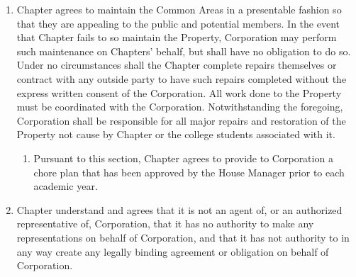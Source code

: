 \documentclass[12pt]{article}
\begin{document}
\begin{enumerate}
        \item Chapter agrees to maintain the Common Areas in a presentable fashion so that they are appealing to the public and potential members.
                In the event that Chapter fails to so maintain the Property, Corporation may perform such maintenance on Chapters' behalf, but shall have no obligation to do so.
                Under no circumstances shall the Chapter complete repairs themselves or contract with any outside party to have such repairs completed without the express written consent of the Corporation.
                All work done to the Property must be coordinated with the Corporation.
                Notwithstanding the foregoing, Corporation shall be responsible for all major repairs and restoration of the Property not cause by Chapter or the college students associated with it.

              \begin{enumerate}[label=\alph*.]
                      \item Pursuant to this section, Chapter agrees to provide to Corporation a chore plan that has been approved by the House Manager prior to each academic year.
              \end{enumerate}


        \item Chapter understand and agrees that it is not an agent of, or an authorized representative of, Corporation, that it has no authority to make any representations on behalf of Corporation, and that it has not authority to in any way create any legally binding agreement or obligation on behalf of Corporation.


\end{enumerate}
\end{document}

